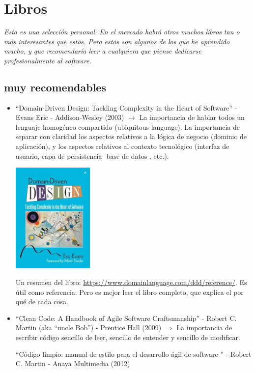 \documentclass[spanish,12pt,a4paper,final,oneside]{book}
\begin{document}
\chapter{Libros}
\textit{Esta es una selección personal. En el mercado habrá otros muchos libros tan o más interesantes que estos. Pero estos son algunos de los que he aprendido mucho, y que recomendaría leer a cualquiera que piense dedicarse profesionalmente al software.}

\section{muy recomendables}

\begin{itemize}

\item ``Domain-Driven Design: Tackling Complexity in the Heart of Software'' - Evans Eric - Addison-Wesley (2003) $\rightarrow$ La importancia de hablar todos un lenguaje homogéneo compartido (ubiquitous language). La importancia de separar con claridad los aspectos relativos a la lógica de negocio (dominio de aplicación), y los aspectos relativos al contexto tecnológico (interfaz de usuario, capa de persistencia -base de datos-, etc.).

\includegraphics[width=4cm]{portada-DomainDrivenDesign-EricEvans.jpg}

Un resumen del libro: \url{https://www.domainlanguage.com/ddd/reference/}. Es útil como referencia. Pero es mejor leer el libro completo, que explica el por qué de cada cosa.

\item ``Clean Code: A Handbook of Agile Software Craftsmanship'' - Robert C. Martin (aka ``uncle Bob'') - Prentice Hall (2009) $\Rightarrow$ La importancia de escribir código sencillo de leer, sencillo de entender y sencillo de modificar.

``Código limpio: manual de estilo para el desarrollo ágil de software '' - Robert C. Martin - Anaya Multimedia (2012)


\end{itemize}
\end{document}
